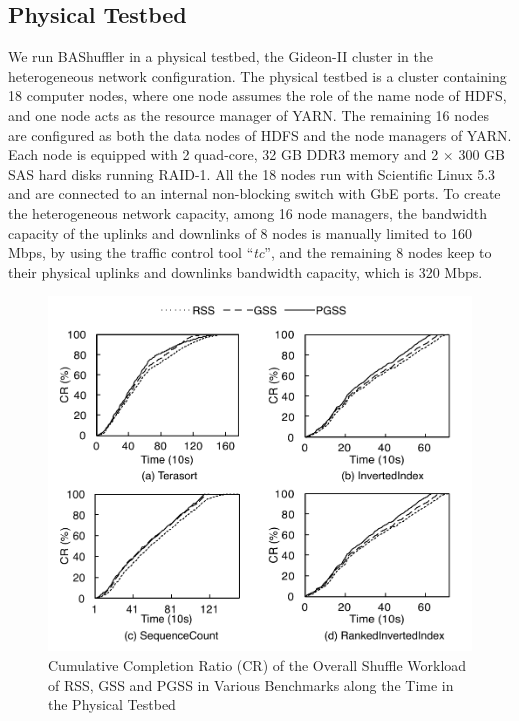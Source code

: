 \documentclass[10pt,journal,compsoc]{IEEEtran}
\begin{document}
\subsection{Physical Testbed}
We run BAShuffler in a physical testbed, the
Gideon-II cluster \cite{gideon} in the heterogeneous network configuration.
The physical testbed is a cluster containing 18 computer nodes, where one node
assumes the role of the name node of HDFS, and
one node acts as the resource manager of YARN. 
The remaining 16 nodes are configured as both the data nodes of HDFS
and the node managers of YARN.
Each node is equipped with 2 quad-core, 32 GB DDR3 memory and
2 $\times$ 300 GB SAS hard disks running RAID-1. 
All the 18 nodes run with Scientific Linux 5.3 and are connected to an internal non-blocking switch with GbE ports. 
To create the heterogeneous network capacity, among 16 node managers, 
the bandwidth capacity of the uplinks and downlinks of 8 nodes is
manually limited to 160 Mbps,
by using the traffic control tool ``\emph{tc}'', 
and the remaining 8 nodes keep to their physical uplinks and downlinks
bandwidth capacity, which is 320 Mbps.


\begin{figure}
\centering
\includegraphics[width=1\columnwidth]{figure5}
\caption{Cumulative Completion Ratio (CR) of the Overall Shuffle Workload of RSS, GSS and PGSS in Various Benchmarks along the Time
in the Physical Testbed} 
\label{fig:new_completion_ratio}
\end{figure}
\end{document}
